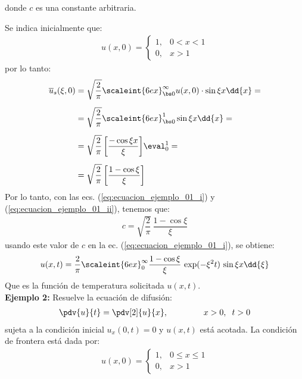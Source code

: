 donde $c$ es una constante arbitraria.
\par
Se indica inicialmente que:
\begin{align*}
u(x, 0) = \begin{cases}
1, & 0 < x < 1 \\
0, & x > 1
\end{cases}
\end{align*}
por lo tanto:
\begin{align}
\begin{aligned}
\overline{u}_{s} (\xi, 0) &= \sqrt{\dfrac{2}{\pi}} \scaleint{6ex}_{\bs 0}^{\infty} u(x, 0) \cdot \sin \xi x \dd{x} = \\[0.5em]
&= \sqrt{\dfrac{2}{\pi}} \scaleint{6ex}_{\bs 0}^{1} \sin \xi x \dd{x} = \\[0.5em]
&= \sqrt{\dfrac{2}{\pi}} \, \bigg[ \dfrac{- \cos \xi x}{\xi} \bigg]\eval_{0}^{1} = \\[0.5em]
&= \sqrt{\dfrac{2}{\pi}} \, \bigg[ \dfrac{1 - \cos \xi}{\xi} \bigg]
\end{aligned}
\label{eq:ecuacion_ejemplo_01_ii}
\end{align}
Por lo tanto, con las ecs. (\ref{eq:ecuacion_ejemplo_01_i}) y (\ref{eq:ecuacion_ejemplo_01_ii}), tenemos que:
\begin{align*}
c = \sqrt{\dfrac{2}{\pi}} \, \dfrac{1 - \cos \xi}{\xi}
\end{align*}
usando este valor de $c$ en la ec. (\ref{eq:ecuacion_ejemplo_01_i}), se obtiene:
\begin{align*}
u(x, t) = \dfrac{2}{\pi} \scaleint{6ex}_{0}^{\infty} \dfrac{1 - \cos \xi}{\xi} \, \exp(- \xi^{2} t) \, \sin \xi x \dd{\xi}
\end{align*}
Que es la función de temperatura solicitada $u (x, t)$.
\\[0.5cm]
\noindent
\textbf{Ejemplo 2: } Resuelve la ecuación de difusión:
\begin{align*}
\pdv{u}{t} = \pdv[2]{u}{x}, \hspace{1.5cm} x > 0, \hspace{0.2cm} t > 0
\end{align*}
sujeta a la condición inicial $u_{x} (0, t) = 0$ y $u (x, t)$ está acotada. La condición de frontera está dada por:
\begin{align*}
u(x, 0) = \begin{cases}
1, & 0 \leq x \leq 1 \\
0, & x > 1
\end{cases}
\end{align*}
\\[0.5em]
